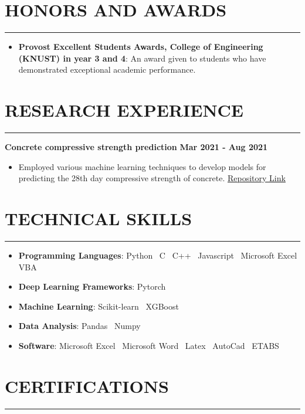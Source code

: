 \documentclass[letterpaper, 11pt]{article}
\newcommand{\cvsection}[1]{
	\section*{#1} \vspace*{-0.8cm}%
	\rule{\linewidth}{1.5pt}\par
}
\begin{document}

\cvsection{HONORS AND AWARDS}

\begin{itemize}[leftmargin=*]

	\item \textbf{Provost Excellent Students Awards, College of Engineering (KNUST) in year 3 and 4}:
	      An award given to students who have demonstrated exceptional academic performance.

\end{itemize}


\cvsection{RESEARCH EXPERIENCE}

\textbf{Concrete compressive strength prediction} \hfill \space \textbf{Mar 2021 - Aug 2021}

\begin{itemize}[leftmargin=*]

	\item Employed various machine learning techniques to develop models for predicting the 28th day
	      compressive strength of concrete.
	      \href{https://www.github.com/patrickboateng/compressive-strength-prediction}{Repository Link}

\end{itemize}


\cvsection{TECHNICAL SKILLS}

\begin{itemize}[leftmargin=*]

	\item \textbf{Programming Languages}: Python \vrule \, C \vrule \, C++ \vrule \,  Javascript \vrule \, Microsoft Excel VBA
	\item \textbf{Deep Learning Frameworks}: Pytorch
	\item \textbf{Machine Learning}: Scikit-learn \vrule \, XGBoost
	\item \textbf{Data Analysis}: Pandas \vrule \, Numpy
	\item \textbf{Software}: Microsoft Excel \vrule \, Microsoft Word \vrule \, Latex \vrule \, AutoCad \vrule \, ETABS

\end{itemize}


\cvsection{CERTIFICATIONS}
\end{document}
